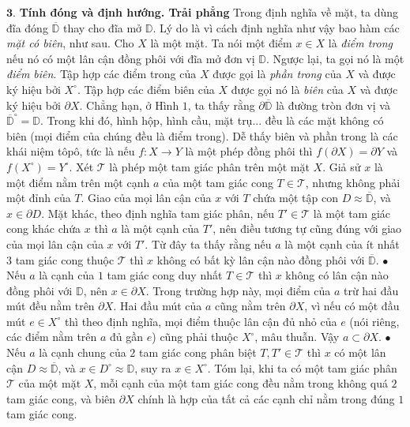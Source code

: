 \begin{multicols}{2}
	\vskip 0.1cm
	$\pmb{3.}$ \textbf{\color{duongvaotoanhoc}Tính đóng và định hướng. Trải phẳng}
	\vskip 0.1cm
	Trong định nghĩa về mặt, ta dùng đĩa đóng $\overline{\mathbb{D}}$ thay cho đĩa mở $\mathbb{D}$. Lý do là vì cách định nghĩa như vậy bao hàm các {\it mặt có biên}, như sau. Cho $X$ là một mặt. Ta nói một điểm $x \in X$ là {\it điểm trong} nếu nó có một lân cận đồng phôi với đĩa mở đơn vị $\mathbb{D}$. Ngược lại, ta gọi nó là một {\it điểm biên}. Tập hợp các điểm trong của $X$ được gọi là {\it phần trong} của $X$ và được ký hiệu bởi $X^\circ$. Tập hợp các điểm biên của $X$ được gọi nó là {\it biên} của $X$ và được ký hiệu bởi $\partial X$. 
	\vskip 0.1cm
	Chẳng hạn, ở Hình $1$, ta thấy rằng $\partial \overline{\mathbb{D}}$ là đường tròn đơn vị và $\overline{\mathbb{D}}^\circ = \mathbb{D}$. Trong khi đó, hình hộp, hình cầu, mặt trụ... đều là các mặt không có biên (mọi điểm của chúng đều là điểm trong). Dễ thấy biên và phần trong là các khái niệm tôpô, tức là nếu $f: X \to Y$ là một phép đồng phôi thì $f(\partial X) = \partial Y$ và $f(X^\circ) = Y^\circ$.
	\vskip 0.1cm
	Xét $\mathscr{T}$ là phép một tam giác phân trên một mặt $X$. Giả sử $x$ là một điểm nằm trên một cạnh $a$ của một tam giác cong $T \in \mathscr{T}$, nhưng không phải một đỉnh của $T$. Giao của mọi lân cận của $x$ với $T$ chứa một tập con $D \approx \overline{\mathbb{D}}$, và $x \in \partial D$. Mặt khác, theo định nghĩa tam giác phân, nếu $T' \in \mathscr{T}$ là một tam giác cong khác chứa $x$ thì $a$ là một cạnh của $T'$, nên điều tương tự cũng đúng với giao của mọi lân cận của $x$ với $T'$. Từ đây ta thấy rằng nếu $a$ là một cạnh của ít nhất $3$ tam giác cong thuộc $\mathscr{T}$ thì $x$ không có bất kỳ lân cận nào đồng phôi với $\overline{\mathbb{D}}$. 
	\vskip 0.1cm
	$\bullet$ Nếu $a$ là cạnh của $1$ tam giác cong duy nhất $T \in \mathscr{T}$ thì $x$ không có lân cận nào đồng phôi với $\mathbb{D}$, nên $x \in \partial X$. Trong trường hợp này, mọi điểm của $a$ trừ hai đầu mút đều nằm trên $\partial X$. Hai đầu mút của $a$ cũng nằm trên $\partial X$, vì nếu có một đầu mút $e \in X^\circ$ thì theo định nghĩa, mọi điểm thuộc lân cận đủ nhỏ của $e$ (nói riêng, các điểm nằm trên $a$ đủ gần $e$) cũng phải thuộc $X^\circ$, mâu thuẫn. Vậy $a \subset \partial X$.
	\vskip 0.1cm	
	$\bullet$ Nếu $a$ là cạnh chung của $2$ tam giác cong phân biệt $T,T' \in \mathscr{T}$ thì $x$ có một lân cận $D \approx \overline{\mathbb{D}}$, và $x \in D^\circ \approx \mathbb{D}$, suy ra $x \in X^\circ$.
	\vskip 0.1cm
	Tóm lại, khi ta có một tam giác phân $\mathscr{T}$ của một mặt $X$, mỗi cạnh của một tam giác cong đều nằm trong không quá $2$ tam giác cong, và biên $\partial X$ chính là hợp của tất cả các cạnh chỉ nằm trong đúng $1$ tam giác cong.

\end{multicols}
